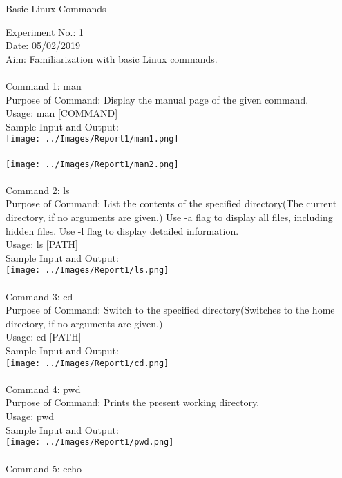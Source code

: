 \documentclass[10pt,a4paper]{report}
\begin{document}
\begin{center}
\begin{Large}
Basic Linux Commands
\end{Large}
\end{center}
Experiment No.: 1\\
Date: 05/02/2019\\
Aim: Familiarization with basic Linux commands.\\
\\
Command 1: man\\
Purpose of Command: Display the manual page of the given command.\\
Usage: man [COMMAND]\\
Sample Input and Output: \\	
\texttt{[image: ../Images/Report1/man1.png]}\\
\\
\texttt{[image: ../Images/Report1/man2.png]}\\
\\
Command 2: ls\\
Purpose of Command: List the contents of the specified directory(The current directory, if no arguments are given.) Use -a flag to display all files, including hidden files. Use -l flag to display detailed information.\\
Usage: ls [PATH]\\
Sample Input and Output: \\
\texttt{[image: ../Images/Report1/ls.png]}\\
\pagebreak
\\
Command 3: cd\\
Purpose of Command: Switch to the specified directory(Switches to the home directory, if no arguments are given.)\\
Usage: cd [PATH]\\
Sample Input and Output: \\
\texttt{[image: ../Images/Report1/cd.png]}\\
\\
Command 4: pwd\\
Purpose of Command: Prints the present working directory.\\
Usage: pwd\\
Sample Input and Output: \\
\texttt{[image: ../Images/Report1/pwd.png]}\\
\\
Command 5: echo\\
\end{document}
